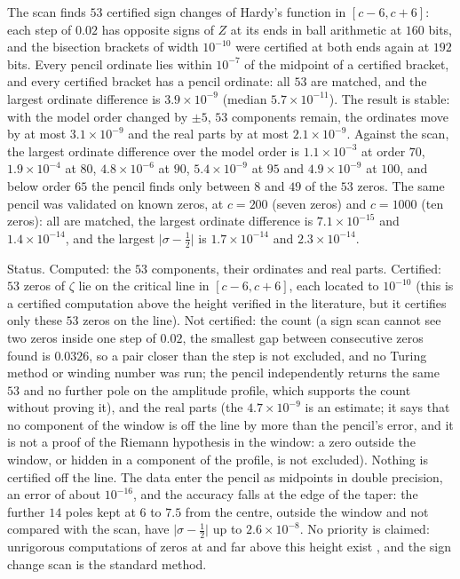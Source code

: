 \begin{resultpar}\label{es:res:zeros1e13}The scan finds $53$ certified sign changes of Hardy's function in $[c-6,c+6]$: each step of $0.02$ has opposite signs of $Z$ at its ends in ball arithmetic at $160$ bits, and the bisection brackets of width $10^{-10}$ were certified at both ends again at $192$ bits. Every pencil ordinate lies within $10^{-7}$ of the midpoint of a certified bracket, and every certified bracket has a pencil ordinate: all $53$ are matched, and the largest ordinate difference is $3.9\times10^{-9}$ (median $5.7\times10^{-11}$). The result is stable: with the model order changed by $\pm5$, $53$ components remain, the ordinates move by at most $3.1\times10^{-9}$ and the real parts by at most $2.1\times10^{-9}$. Against the scan, the largest ordinate difference over the model order is $1.1\times10^{-3}$ at order $70$, $1.9\times10^{-4}$ at $80$, $4.8\times10^{-6}$ at $90$, $5.4\times10^{-9}$ at $95$ and $4.9\times10^{-9}$ at $100$, and below order $65$ the pencil finds only between $8$ and $49$ of the $53$ zeros. The same pencil was validated on known zeros, at $c=200$ (seven zeros) and $c=1000$ (ten zeros): all are matched, the largest ordinate difference is $7.1\times10^{-15}$ and $1.4\times10^{-14}$, and the largest $\lvert\sigma-\tfrac12\rvert$ is $1.7\times10^{-14}$ and $2.3\times10^{-14}$.

Status. Computed: the $53$ components, their ordinates and real parts. Certified: $53$ zeros of $\zeta$ lie on the critical line in $[c-6,c+6]$, each located to $10^{-10}$ (this is a certified computation above the height verified in the literature, but it certifies only these $53$ zeros on the line). Not certified: the count (a sign scan cannot see two zeros inside one step of $0.02$, the smallest gap between consecutive zeros found is $0.0326$, so a pair closer than the step is not excluded, and no Turing method or winding number was run; the pencil independently returns the same $53$ and no further pole on the amplitude profile, which supports the count without proving it), and the real parts (the $4.7\times10^{-9}$ is an estimate; it says that no component of the window is off the line by more than the pencil's error, and it is not a proof of the Riemann hypothesis in the window: a zero outside the window, or hidden in a component of the profile, is not excluded). Nothing is certified off the line. The data enter the pencil as midpoints in double precision, an error of about $10^{-16}$, and the accuracy falls at the edge of the taper: the further $14$ poles kept at $6$ to $7.5$ from the centre, outside the window and not compared with the scan, have $\lvert\sigma-\tfrac12\rvert$ up to $2.6\times10^{-8}$. No priority is claimed: unrigorous computations of zeros at and far above this height exist \cite{Gourdon04,Odlyzko92,Odlyzko01}, and the sign change scan is the standard method.\end{resultpar}

